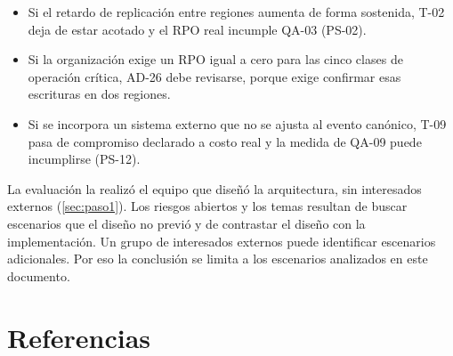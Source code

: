 \documentclass[11pt,letterpaper]{article}
\begin{document}
\begin{itemize}
  \item Si el retardo de replicación entre regiones aumenta de forma sostenida, T-02 deja de estar
        acotado y el RPO real incumple QA-03 (PS-02).
  \item Si la organización exige un RPO igual a cero para las cinco clases de operación crítica,
        AD-26 debe revisarse, porque exige confirmar esas escrituras en dos regiones.
  \item Si se incorpora un sistema externo que no se ajusta al evento canónico, T-09 pasa de
        compromiso declarado a costo real y la medida de QA-09 puede incumplirse (PS-12).
\end{itemize}

La evaluación la realizó el equipo que diseñó la arquitectura, sin interesados externos
(\cref{sec:paso1}). Los riesgos abiertos y los temas resultan de buscar escenarios que el diseño no
previó y de contrastar el diseño con la implementación. Un grupo de interesados externos puede identificar escenarios adicionales. Por
eso la conclusión se limita a los escenarios analizados en este documento.

\section{Referencias}
\label{sec:referencias}
\end{document}
